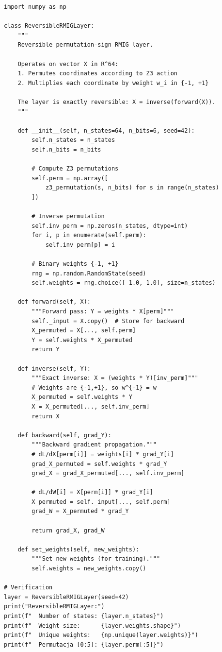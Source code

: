 \documentclass[11pt,a4paper]{report}
\begin{document}
\label{app:ch2-lst3}
\begin{lstlisting}[caption={Full implementation of the reversible RMIG layer}]
import numpy as np

class ReversibleRMIGLayer:
    """
    Reversible permutation-sign RMIG layer.
    
    Operates on vector X in R^64:
    1. Permutes coordinates according to Z3 action
    2. Multiplies each coordinate by weight w_i in {-1, +1}
    
    The layer is exactly reversible: X = inverse(forward(X)).
    """
    
    def __init__(self, n_states=64, n_bits=6, seed=42):
        self.n_states = n_states
        self.n_bits = n_bits
        
        # Compute Z3 permutations
        self.perm = np.array([
            z3_permutation(s, n_bits) for s in range(n_states)
        ])
        
        # Inverse permutation
        self.inv_perm = np.zeros(n_states, dtype=int)
        for i, p in enumerate(self.perm):
            self.inv_perm[p] = i
        
        # Binary weights {-1, +1}
        rng = np.random.RandomState(seed)
        self.weights = rng.choice([-1.0, 1.0], size=n_states)
    
    def forward(self, X):
        """Forward pass: Y = weights * X[perm]"""
        self._input = X.copy()  # Store for backward
        X_permuted = X[..., self.perm]
        Y = self.weights * X_permuted
        return Y
    
    def inverse(self, Y):
        """Exact inverse: X = (weights * Y)[inv_perm]"""
        # Weights are {-1,+1}, so w^{-1} = w
        X_permuted = self.weights * Y
        X = X_permuted[..., self.inv_perm]
        return X
    
    def backward(self, grad_Y):
        """Backward gradient propagation."""
        # dL/dX[perm[i]] = weights[i] * grad_Y[i]
        grad_X_permuted = self.weights * grad_Y
        grad_X = grad_X_permuted[..., self.inv_perm]
        
        # dL/dW[i] = X[perm[i]] * grad_Y[i]
        X_permuted = self._input[..., self.perm]
        grad_W = X_permuted * grad_Y
        
        return grad_X, grad_W
    
    def set_weights(self, new_weights):
        """Set new weights (for training)."""
        self.weights = new_weights.copy()

# Verification
layer = ReversibleRMIGLayer(seed=42)
print("ReversibleRMIGLayer:")
print(f"  Number of states: {layer.n_states}")
print(f"  Weight size:      {layer.weights.shape}")
print(f"  Unique weights:   {np.unique(layer.weights)}")
print(f"  Permutacja [0:5]: {layer.perm[:5]}")
\end{lstlisting}
\end{document}
